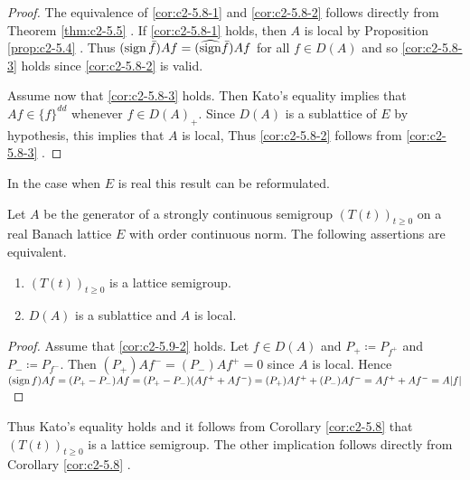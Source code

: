\begin{proof}
The equivalence of \ref{cor:c2-5.8-1}   and \ref{cor:c2-5.8-2}   follows directly from Theorem \ref{thm:c2-5.5}  . 
If \ref{cor:c2-5.8-1}   holds, then $A$ is local by  Proposition \ref{prop:c2-5.4}  .
Thus $(\operatorname{sign}  \bar{f})Af = (\widehat{\operatorname{sign}}  \bar{f})Af$ for all $f \in D(A)$ and so \ref{cor:c2-5.8-3}   holds since \ref{cor:c2-5.8-2}   is valid.

Assume now that \ref{cor:c2-5.8-3}   holds. 
Then Kato's equality implies that $Af \in \{f\}^{dd}$ whenever $f \in D(A)_{+}$. 
Since $D(A)$ is a sublattice of $E$ by hypothesis, this implies that $A$ is local, Thus \ref{cor:c2-5.8-2}   follows from \ref{cor:c2-5.8-3}   .
\end{proof}

In the case when $E$ is real this result can be reformulated.

\begin{corollary}\label{cor:c2-5.9}
Let $A$ be the generator of a strongly continuous semigroup $(T(t))_{t \geq 0}$ on a real Banach lattice $E$ with order continuous norm. 
The following assertions are equivalent.
\begin{enumerate}[\upshape (a)]
\item \label{cor:c2-5.9-1}
$(T(t))_{t \geq 0}$ is a lattice semigroup.
\item \label{cor:c2-5.9-2}
$D(A)$ is a sublattice and $A$ is local.
\end{enumerate}
\end{corollary}

\begin{proof}
Assume that \ref{cor:c2-5.9-2}   holds. 
Let $f \in D(A)$ and $P_{+} \coloneqq P_{f^{+}}$ and $P_{-} \coloneqq P_{f^{-}}$.
Then $(P_{+})Af^{-} = (P_{-})Af^{+} = 0$ since $A$ is local. 
Hence $(\operatorname{sign}  f)Af = (P_{+} - P_{-})Af = (P_{+} - P_{-})(Af^{+} + Af^{-}) = 
(P_{+})Af^{+} + (P_{-})Af^{-} = Af^{+} + Af^{-} = A|f|$
\end{proof}

Thus Kato's equality holds and it follows from Corollary \ref{cor:c2-5.8}   that $(T(t))_{t \geq 0}$ is a lattice semigroup. The other implication follows directly from Corollary  \ref{cor:c2-5.8}  .

